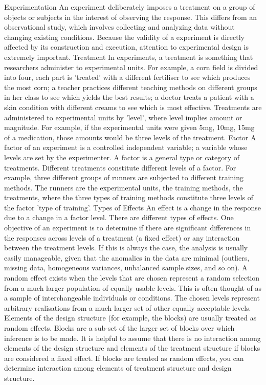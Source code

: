 Experimentation
An experiment deliberately imposes a treatment on a group of objects or subjects in the interest of observing the response. This differs from an observational study, which involves collecting and analyzing data without changing existing conditions. Because the validity of a experiment is directly affected by its construction and execution, attention to experimental design is extremely important.
Treatment
In experiments, a treatment is something that researchers administer to experimental units. For example, a corn field is divided into four, each part is 'treated' with a different fertiliser to see which produces the most corn; a teacher practices different teaching methods on different groups in her class to see which yields the best results; a doctor treats a patient with a skin condition with different creams to see which is most effective. 
Treatments are administered to experimental units by 'level', where level implies amount or magnitude. For example, if the experimental units were given 5mg, 10mg, 15mg of a medication, those amounts would be three levels of the treatment. 
Factor
A factor of an experiment is a controlled independent variable; a variable whose levels are set by the experimenter.
A factor is a general type or category of treatments. Different treatments constitute different levels of a factor. For example, three different groups of runners are subjected to different training methods. The runners are the experimental units, the training methods, the treatments, where the three types of training methods constitute three levels of the factor 'type of training'. 
Types of Effects 
An effect is a change in the response due to a change in a factor level.  There are different types of effects.  One objective of an experiment is to determine if there are significant differences in the responses across levels of a treatment (a fixed effect) or any interaction  between the treatment levels.  If this is always the case, the analysis is usually easily  manageable, given that the anomalies in the data are minimal (outliers, missing data,  homogeneous variances, unbalanced sample sizes, and so on). 
A random effect exists when the levels that are chosen represent a random selection from a much larger population of equally usable levels. This is often thought of as a sample of interchangeable individuals or conditions.  The chosen levels represent arbitrary realisations from a much larger set of other equally acceptable levels.  Elements of the design structure (for example, the blocks) are usually treated as random  effects.  Blocks are a sub-set of the larger set of blocks over which inference is to be made.  It  is helpful to assume that there is no interaction among elements of the design structure and  elements of the treatment structure if blocks are considered a fixed effect.  If blocks are treated as random effects, you can determine interaction among elements of treatment structure and  design structure. 
